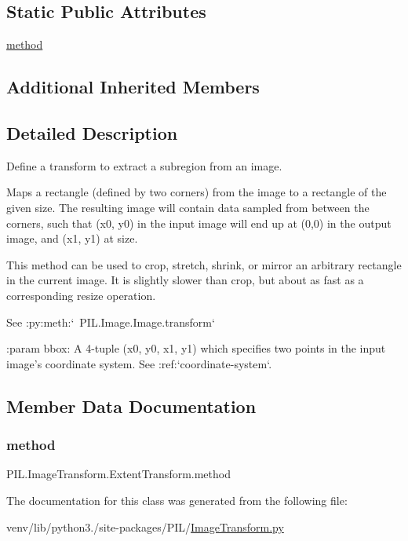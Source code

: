 \subsection*{Static Public Attributes}
\begin{DoxyCompactItemize}
\item 
\hyperlink{classPIL_1_1ImageTransform_1_1ExtentTransform_a457fa6c906052c840593f167c6323896}{method}
\end{DoxyCompactItemize}
\subsection*{Additional Inherited Members}


\subsection{Detailed Description}
\begin{DoxyVerb}Define a transform to extract a subregion from an image.

Maps a rectangle (defined by two corners) from the image to a rectangle of
the given size. The resulting image will contain data sampled from between
the corners, such that (x0, y0) in the input image will end up at (0,0) in
the output image, and (x1, y1) at size.

This method can be used to crop, stretch, shrink, or mirror an arbitrary
rectangle in the current image. It is slightly slower than crop, but about
as fast as a corresponding resize operation.

See :py:meth:`~PIL.Image.Image.transform`

:param bbox: A 4-tuple (x0, y0, x1, y1) which specifies two points in the
    input image's coordinate system. See :ref:`coordinate-system`.
\end{DoxyVerb}
 

\subsection{Member Data Documentation}
\mbox{\label{classPIL_1_1ImageTransform_1_1ExtentTransform_a457fa6c906052c840593f167c6323896}} 
\subsubsection{\texorpdfstring{method}{method}}
{\footnotesize\ttfamily P\+I\+L.\+Image\+Transform.\+Extent\+Transform.\+method\hspace{0.3cm}{\ttfamily [static]}}



The documentation for this class was generated from the following file\+:\begin{DoxyCompactItemize}
\item 
venv/lib/python3./site-\/packages/\+P\+I\+L/\hyperlink{ImageTransform_8py}{Image\+Transform.\+py}\end{DoxyCompactItemize}
